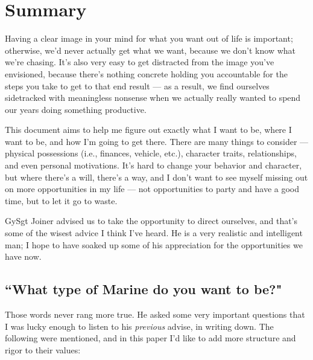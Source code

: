 \chapter{Summary}

Having a clear image in your mind for what you want out of life is important;
otherwise, we'd never actually get what we want, because we don't know what we're
chasing. It's also very easy to get distracted from the image you've envisioned,
because there's nothing concrete holding you accountable for the steps you take
to get to that end result --- as a result, we find ourselves sidetracked with
meaningless nonsense when we actually really wanted to spend our years doing
something productive.

This document aims to help me figure out exactly what I want to be, where I want
to be, and how I'm going to get there. There are many things to consider ---
physical possessions (i.e., finances, vehicle, etc.), character traits,
relationships, and even personal motivations. It's hard to change your behavior
and character, but where there's a will, there's a way, and I don't want to
see myself missing out on more opportunities in my life --- not opportunities to
party and have a good time, but to let it go to waste.

GySgt Joiner advised us to take the opportunity to direct ourselves, and that's
some of the wisest advice I think I've heard. He is a very realistic and intelligent
man; I hope to have soaked up some of his appreciation for the opportunities we
have now.

\section{``What type of Marine do you want to be?"}

Those words never rang more true. He asked some very important questions that I
was lucky enough to listen to his \textit{previous} advise, in writing down.
The following were mentioned, and in this paper I'd like to add more structure
and rigor to their values:

